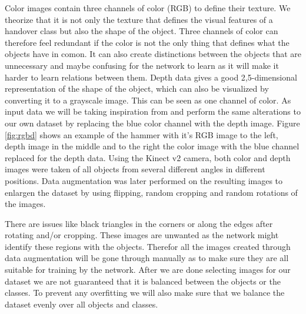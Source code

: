 Color images contain three channels of color (RGB) to define their texture. We theorize that it is not only the texture that defines the visual features of a handover class but also the shape of the object. Three channels of color can therefore feel redundant if the color is not the only thing that defines what the objects have in comon. It can also create distinctions between the objects that are unnecessary and maybe confusing for the network to learn as it will make it harder to learn relations between them. Depth data gives a good 2,5-dimensional representation of the shape of the object, which can also be visualized by converting it to a grayscale image. This can be seen as one channel of color. As input data we will be taking inspiration from \parencite{Redmon2014} and perform the same alterations to our own dataset by replacing the blue color channel with the depth image. Figure \ref{fig:rgbd} shows an example of the hammer with it's RGB image to the left, depth image in the middle and to the right the color image with the blue channel replaced for the depth data. Using the Kinect v2 camera, both color and depth images were taken of all objects from several different angles in different positions. Data augmentation was later performed on the resulting images to enlargen the dataset by using flipping, random cropping and random rotations of the images.

There are issues like black triangles in the corners or along the edges after rotating and/or cropping. These images are unwanted as the network might identify these regions with the objects. Therefor all the images created through data augmentation will be gone through manually as to make sure they are all suitable for training by the network. After we are done selecting images for our dataset we are not guaranteed that it is balanced between the objects or the classes. To prevent any overfitting we will also make sure that we balance the dataset evenly over all objects and classes.

